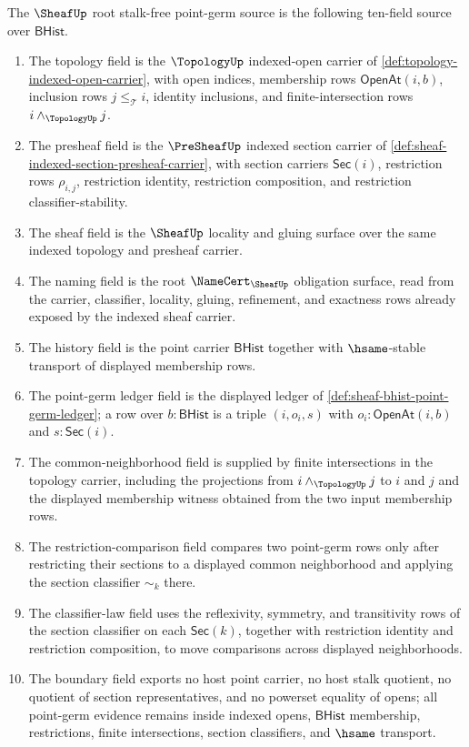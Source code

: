 \begin{definition}
\label{def:sheaf-root-stalk-free-germ-source}
The $\SheafUp$ root stalk-free point-germ source is the following ten-field source over $\mathsf{BHist}$.
\begin{enumerate}
\item The topology field is the $\TopologyUp$ indexed-open carrier of \autoref{def:topology-indexed-open-carrier}, with open indices, membership rows $\mathsf{OpenAt}(i,b)$, inclusion rows $j\le_{\mathcal{T}}i$, identity inclusions, and finite-intersection rows $i\wedge_{\TopologyUp}j$.
\item The presheaf field is the $\PreSheafUp$ indexed section carrier of \autoref{def:sheaf-indexed-section-presheaf-carrier}, with section carriers $\mathsf{Sec}(i)$, restriction rows $\rho_{i,j}$, restriction identity, restriction composition, and restriction classifier-stability.
\item The sheaf field is the $\SheafUp$ locality and gluing surface over the same indexed topology and presheaf carrier.
\item The naming field is the root $\NameCert_{\SheafUp}$ obligation surface, read from the carrier, classifier, locality, gluing, refinement, and exactness rows already exposed by the indexed sheaf carrier.
\item The history field is the point carrier $\mathsf{BHist}$ together with $\hsame$-stable transport of displayed membership rows.
\item The point-germ ledger field is the displayed ledger of \autoref{def:sheaf-bhist-point-germ-ledger}; a row over $b:\mathsf{BHist}$ is a triple $(i,o_i,s)$ with $o_i:\mathsf{OpenAt}(i,b)$ and $s:\mathsf{Sec}(i)$.
\item The common-neighborhood field is supplied by finite intersections in the topology carrier, including the projections from $i\wedge_{\TopologyUp}j$ to $i$ and $j$ and the displayed membership witness obtained from the two input membership rows.
\item The restriction-comparison field compares two point-germ rows only after restricting their sections to a displayed common neighborhood and applying the section classifier $\sim_k$ there.
\item The classifier-law field uses the reflexivity, symmetry, and transitivity rows of the section classifier on each $\mathsf{Sec}(k)$, together with restriction identity and restriction composition, to move comparisons across displayed neighborhoods.
\item The boundary field exports no host point carrier, no host stalk quotient, no quotient of section representatives, and no powerset equality of opens; all point-germ evidence remains inside indexed opens, $\mathsf{BHist}$ membership, restrictions, finite intersections, section classifiers, and $\hsame$ transport.
\end{enumerate}
\end{definition}

